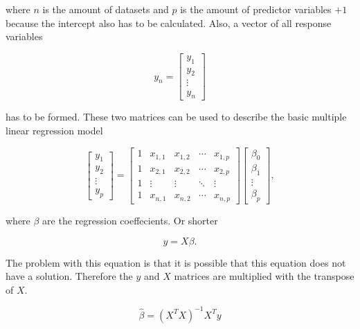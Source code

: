 where $ n $ is the amount of datasets and $ p $ is the amount of predictor variables $ + 1 $ because the intercept also has to be calculated. Also, a vector of all response variables

\begin{equation}
    y_{n} =
        \begin{bmatrix}
            y_{1} \\
            y_{2} \\
            \vdots \\
            y_{n}
        \end{bmatrix}
\end{equation}

has to be formed. These two matrices can be used to describe the basic multiple linear regression model

\begin{equation}
    \begin{bmatrix}
        y_{1} \\
        y_{2} \\
        \vdots \\
        y_{p}
    \end{bmatrix}
    =
    \begin{bmatrix}
            1 & x_{1,1} & x_{1,2} & \cdots & x_{1,p} \\
            1 & x_{2,1} & x_{2,2} & \cdots & x_{2,p} \\
            1 & \vdots & \vdots & \ddots & \vdots \\
            1 & x_{n,1} & x_{n,2} & \cdots & x_{n,p}
    \end{bmatrix}
    \begin{bmatrix}
        \beta_{0} \\
        \beta_{1} \\
        \vdots \\
        \beta_{p}
    \end{bmatrix},
\end{equation}

where $ \beta $ are the regression coeffecients. Or shorter

\begin{equation}
    y = X\beta.
\end{equation}

The problem with this equation is that it is possible that this equation does not have a solution. Therefore the $ y $ and $ X $ matrices are multiplied with the transpose of $ X $.

\begin{equation}
\label{eq:mlr}
    \hat{\beta} = (X^TX)^{-1} X^Ty
\end{equation}

